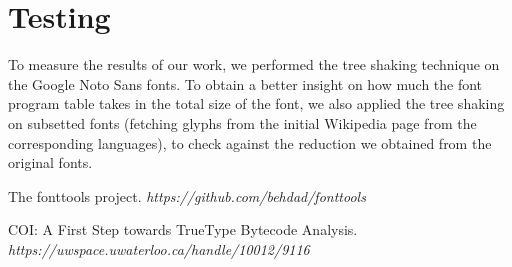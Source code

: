\documentclass[12pt]{article}
\begin{document}
\section{Testing}

To measure the results of our work, we performed the tree shaking
technique on the Google Noto Sans fonts\cite{notosans}. To obtain a
better insight on how much the font program table takes in the total
size of the font, we also applied the tree shaking on  subsetted fonts
(fetching glyphs from the initial Wikipedia page from the corresponding
languages), to check against the reduction we obtained from the original
fonts.
  

\clearpage
\begin{thebibliography}{1}

 The fonttools project. {\em https://github.com/behdad/fonttools } 

 COI: A First Step towards TrueType Bytecode Analysis.
{\em https://uwspace.uwaterloo.ca/handle/10012/9116 } 

\end{thebibliography}
\end{document}

